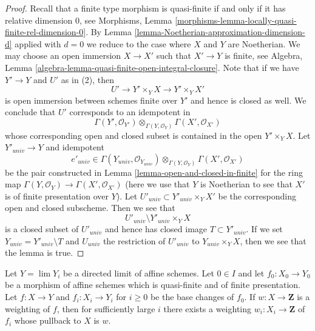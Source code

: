 \begin{proof}
Recall that a finite type morphism is quasi-finite if and only
if it has relative dimension $0$, see
Morphisms, Lemma \ref{morphisms-lemma-locally-quasi-finite-rel-dimension-0}.
By Lemma \ref{lemma-Noetherian-approximation-dimension-d}
applied with $d = 0$ we reduce to the case where
$X$ and $Y$ are Noetherian. We may choose an open immersion
$X \to X'$ such that $X' \to Y$ is finite, see
Algebra, Lemma \ref{algebra-lemma-quasi-finite-open-integral-closure}.
Note that if we have $Y' \to Y$ and $U'$ as in (2), then
$$
U' \to Y' \times_Y X \to Y' \times_Y X'
$$
is open immersion between schemes finite over $Y'$ and hence
is closed as well. We conclude that $U'$ corresponds to an
idempotent in
$$
\Gamma(Y', \mathcal{O}_{Y'})
\otimes_{\Gamma(Y, \mathcal{O}_Y)}
\Gamma(X', \mathcal{O}_{X'})
$$
whose corresponding open and closed subset is contained in
the open $Y' \times_Y X$. Let $Y'_{univ} \to Y$ and idempotent
$$
e'_{univ} \in
\Gamma(Y_{univ}, \mathcal{O}_{Y_{univ}})
\otimes_{\Gamma(Y, \mathcal{O}_Y)}
\Gamma(X', \mathcal{O}_{X'})
$$
be the pair constructed in Lemma \ref{lemma-open-and-closed-in-finite}
for the ring map $\Gamma(Y, \mathcal{O}_Y) \to \Gamma(X', \mathcal{O}_{X'})$
(here we use that $Y$ is Noetherian to see that $X'$ is of finite presentation
over $Y$). Let $U'_{univ} \subset Y'_{univ} \times_Y X'$ be the corresponding
open and closed subscheme. Then we see that
$$
U'_{univ} \setminus Y'_{univ} \times_Y X
$$
is a closed subset of $U'_{univ}$ and hence has closed image
$T \subset Y'_{univ}$. If we set $Y_{univ} = Y'_{univ} \setminus T$
and $U_{univ}$ the restriction of $U'_{univ}$ to
$Y_{univ} \times_Y X$, then we see that the lemma is true.
\end{proof}

\begin{lemma}
\label{lemma-descend-weighting}
Let $Y = \lim Y_i$ be a directed limit of affine schemes. Let $0 \in I$
and let $f_0 : X_0 \to Y_0$ be a morphism of affine schemes which is
quasi-finite and of finite presentation. Let $f : X  \to Y$
and $f_i : X_i \to Y_i$ for $i \geq 0$ be the base changes of $f_0$.
If $w : X \to \mathbf{Z}$ is a weighting of $f$, then for sufficiently
large $i$ there exists a weighting $w_i : X_i \to \mathbf{Z}$
of $f_i$ whose pullback to $X$ is $w$.
\end{lemma}

